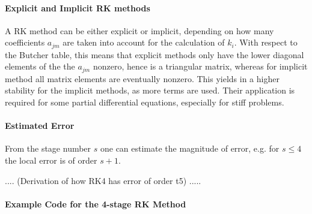 \paragraph{Explicit and Implicit RK methods}
A RK method can be either explicit or implicit, depending on how many coefficients $a_{jm}$ are taken into account for the calculation of $k_i$. With respect to the Butcher table, this means that explicit methods only have the lower diagonal elements of the the $a_{jm}$ nonzero, hence is a triangular matrix, whereas for implicit method all matrix elements are eventually nonzero. This yields in a higher stability for the implicit methods, as more terms are used. Their application is required for some partial differential equations, especially for stiff problems. %



\paragraph{Estimated Error}
From the stage number $s$ one can estimate the magnitude of error, e.g. for $s \leq 4$ the local error is of order $s +1$.


....
(Derivation of how RK4 has error of order t5)
.....







\paragraph{Example Code for the 4-stage RK Method}
